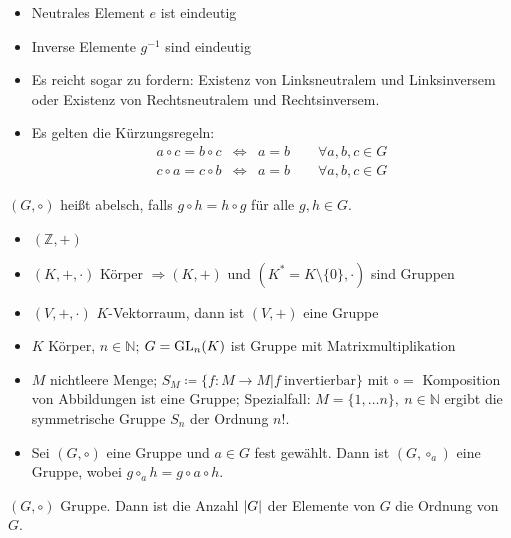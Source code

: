 \documentclass[12pt,a4paper]{scrartcl}
\begin{document}
\begin{bem}
\leavevmode
\begin{itemize}
	\item Neutrales Element $e$ ist eindeutig
	\item Inverse Elemente $g^{-1}$ sind eindeutig
	\item Es reicht sogar zu fordern: Existenz von Linksneutralem und Linksinversem oder Existenz von Rechtsneutralem und Rechtsinversem.
	\item Es gelten die Kürzungsregeln:
		\begin{eqnarray*}
			a\circ c = b\circ c &\Leftrightarrow& a = b\qquad \forall a,b,c\in G\\
			c\circ a = c\circ b &\Leftrightarrow& a = b \qquad \forall a,b,c\in G
		\end{eqnarray*}
\end{itemize}
\end{bem}

\begin{defi}
	$(G,\circ)$ heißt abelsch, falls $g\circ h = h\circ g$ für alle $g,h\in G$.
\end{defi}

\begin{bsp}
\leavevmode
\begin{itemize}
	\item $(\mathbb Z, +)$
	\item $(K,+,\cdot)$ Körper $\Rightarrow (K,+)$ und $(K^*=K\setminus \{0\}, \cdot)$ sind Gruppen
	\item $(V,+,\cdot)$ $K$-Vektorraum, dann ist $(V,+)$ eine Gruppe
	\item $K$ Körper, $n\in\mathbb N$; $G = \operatorname{GL}_n(K)$ ist Gruppe mit Matrixmultiplikation
	\item $M$ nichtleere Menge; $S_M \coloneqq \{f\colon M\to M|f ~ \text{invertierbar}\}$ mit $\circ = $ Komposition von Abbildungen ist eine Gruppe; Spezialfall: $M = \{1,\dots n\},\ n\in\mathbb N$ ergibt die symmetrische Gruppe $S_n$ der Ordnung $n!$.
	\item Sei $(G,\circ)$ eine Gruppe und $a\in G$ fest gewählt. Dann ist $(G,\circ_a)$ eine Gruppe, wobei $g\circ_a h = g\circ a\circ h$.
\end{itemize}
\end{bsp}

\begin{defi} 
	$(G,\circ)$ Gruppe. Dann ist die Anzahl $\lvert G\rvert$ der Elemente von $G$ die Ordnung von $G$.
\end{defi}
\end{document}

